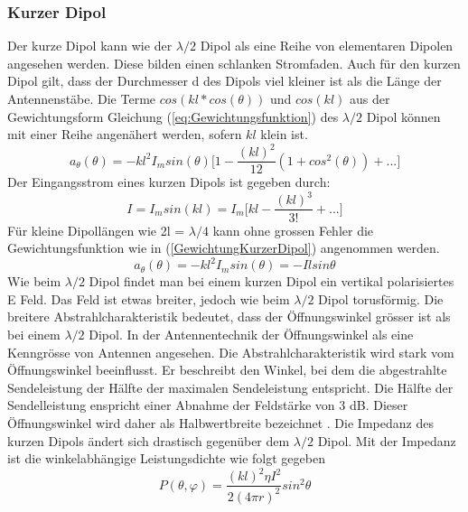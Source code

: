 \newpage
\subsubsection{Kurzer Dipol }\label{sec:kurzerDipol}
Der kurze Dipol kann wie der $\lambda /2$ Dipol als eine Reihe von elementaren Dipolen angesehen werden. Diese bilden einen schlanken Stromfaden. Auch für den kurzen Dipol gilt, dass der Durchmesser d des Dipols viel kleiner ist als die Länge der Antennenstäbe. 
Die Terme $cos(kl*cos(\theta)) $ und $cos(kl)$ aus der Gewichtungsform Gleichung (\ref{eq:Gewichtungsfunktion})
 des $\lambda/2$ Dipol können mit einer Reihe angenähert werden, sofern $kl$ klein ist.
\begin{equation}
a_{\theta}(\theta)=-kl^{2}I_{m}sin(\theta) \biggl\lbrack 1- \frac{(kl)^{2}}{12}(1+cos^{2}(\theta))+...\biggr\rbrack
\end{equation}
Der Eingangsstrom eines kurzen Dipols ist gegeben durch:
\begin{equation}
I=I_{m}sin(kl)=I_{m}\biggl\lbrack kl - \frac{(kl)^{3}}{3!} +... \biggr\rbrack
\end{equation}
 Für kleine Dipollängen wie 2l = $\lambda/4 $ kann ohne grossen Fehler die Gewichtungsfunktion wie in   (\ref{GewichtungKurzerDipol})  angenommen werden.
\begin{equation}\label{GewichtungKurzerDipol}
a_{\theta}(\theta)=-kl^{2}I_{m}sin(\theta)=-Ilsin\theta
\end{equation}
Wie beim $\lambda/2$ Dipol findet man bei einem kurzen Dipol ein vertikal polarisiertes E Feld. Das Feld ist etwas breiter, jedoch wie beim $\lambda/2$ Dipol torusförmig. Die breitere Abstrahlcharakteristik  bedeutet, dass der Öffnungswinkel grösser ist als bei einem $\lambda/2$ Dipol. In der Antennentechnik  der Öffnungswinkel als eine Kenngrösse von Antennen angesehen. Die Abstrahlcharakteristik wird stark vom Öffnungswinkel beeinflusst. Er beschreibt  den Winkel, bei dem die abgestrahlte Sendeleistung der Hälfte der maximalen Sendeleistung entspricht. Die Hälfte der Sendelleistung enspricht  einer Abnahme der Feldstärke von 3 dB. Dieser Öffnungswinkel wird  daher als Halbwertbreite bezeichnet \cite{Oeffnungswinkel}.  Die Impedanz des kurzen Dipols ändert sich  drastisch gegenüber dem $\lambda/2$ Dipol. Mit der Impedanz ist  die winkelabhängige Leistungsdichte wie folgt gegeben\cite{elliott1981antenna}
\begin{equation}
P(\theta,\varphi)=\frac{(kl)^{2}\eta I^{2}}{2(4\pi r)^{2}}sin^{2}\theta
\label{Prad_kurzerDipol}
\end{equation}
